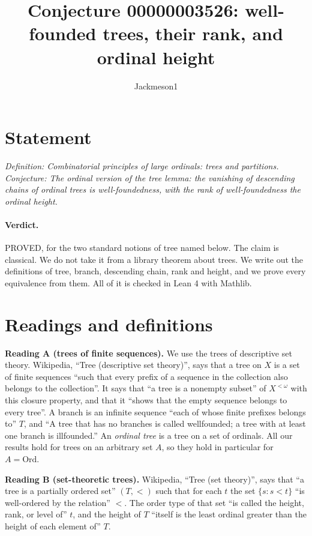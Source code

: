 \documentclass[11pt]{article}
\title{Conjecture 00000003526: well-founded trees, their rank, and ordinal height}
\author{Jackmeson1}
\date{}
\theoremstyle{definition}
\begin{document}
\maketitle

\section*{Statement}
\emph{Definition: Combinatorial principles of large ordinals: trees and partitions. Conjecture: The
ordinal version of the tree lemma: the vanishing of descending chains of ordinal trees is
well-foundedness, with the rank of well-foundedness the ordinal height.}

\paragraph{Verdict.} PROVED, for the two standard notions of tree named below. The claim is classical.
We do not take it from a library theorem about trees. We write out the definitions of tree, branch,
descending chain, rank and height, and we prove every equivalence from them. All of it is checked in
Lean 4 with Mathlib.

\section{Readings and definitions}
\textbf{Reading A (trees of finite sequences).} We use the trees of descriptive set theory. Wikipedia,
``Tree (descriptive set theory)'', says that a tree on $X$ is a set of finite sequences ``such that
every prefix of a sequence in the collection also belongs to the collection''. It says that ``a tree
is a nonempty subset'' of $X^{<\omega}$ with this closure property, and that it ``shows that the
empty sequence belongs to every tree''. A branch is an infinite sequence ``each of whose finite
prefixes belongs to'' $T$, and ``A tree that has no branches is called wellfounded; a tree with at
least one branch is illfounded.'' An \emph{ordinal tree} is a tree on a set of ordinals. All our
results hold for trees on an arbitrary set $A$, so they hold in particular for $A=\mathrm{Ord}$.

\textbf{Reading B (set-theoretic trees).} Wikipedia, ``Tree (set theory)'', says that ``a tree is a
partially ordered set'' $(T,<)$ such that for each $t$ the set $\{s:s<t\}$ ``is well-ordered by the
relation'' $<$. The order type of that set ``is called the height, rank, or level of'' $t$, and the
height of $T$ ``itself is the least ordinal greater than the height of each element of'' $T$.
\end{document}
